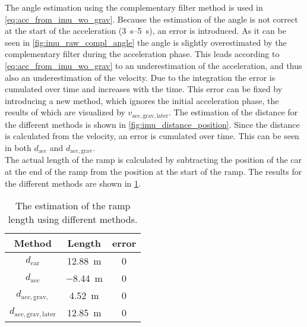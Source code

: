 The angle estimation using the complementary filter method is used in \cref{eq:acc_from_imu_wo_grav}.
Because the estimation of the angle is not correct at the start of the acceleration (\SIrange{3}{5}{\second}), an error is introduced.
As it can be seen in \cref{fig:imu_raw_compl_angle} the angle is slightly overestimated by the complementary filter during the acceleration phase.
This leads according to \cref{eq:acc_from_imu_wo_grav} to an underestimation of the acceleration, and thus also an underestimation of the velocity.
Due to the integration the error is cumulated over time and increases with the time.
This error can be fixed by introducing a new method, which ignores the initial acceleration phase, the results of which are visualized by $v_\mathrm{acc, grav, later}$.
The estimation of the distance for the different methods is shown in \cref{fig:imu_distance_position}.
Since the distance is calculated from the velocity, an error is cumulated over time.
This can be seen in both $d_\mathrm{acc}$ and $d_\mathrm{acc, grav}$.\\
The actual length of the ramp is calculated by subtracting the position of the car at the end of the ramp from the position at the start of the ramp.
The results for the different methods are shown in \cref{tab:ramp_length}.

\begin{table}[htb]
	\centering
	\caption[Ramp length]{The estimation of the ramp length using different methods.}
	\label{tab:ramp_length}
	\begin{tabular}[t]{ccc}
		\toprule
		\textbf{Method}                & \textbf{Length}    & \textbf{error} \\
		\midrule
		$d_\mathrm{car} $              & \SI{12.88}{\metre} & 0              \\
		$d_\mathrm{acc} $              & \SI{-8.44}{\metre} & 0              \\
		$d_\mathrm{acc, grav, } $      & \SI{4.52}{\metre}  & 0              \\
		$d_\mathrm{acc, grav, later} $ & \SI{12.85}{\metre} & 0              \\
		\bottomrule
	\end{tabular}
\end{table}




